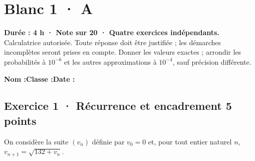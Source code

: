 \fi

\ifmxteacher

\mxnewpage{}\label{sujet:5-3}

\section*{Blanc 1 · A}


\textbf{Durée : 4 h · Note sur 20 · Quatre exercices indépendants.}\\Calculatrice autorisée. Toute réponse doit être justifiée ; les démarches incomplètes seront prises en compte. Donner les valeurs exactes ; arrondir les probabilités à $10^{-6}$ et les autres approximations à $10^{-4}$, sauf précision différente.

\smallskip\textbf{Nom :}\enspace\dotfill\quad\textbf{Classe :}\enspace\dotfill\quad\textbf{Date :}\enspace\dotfill

\subsection*{Exercice 1 · Récurrence et encadrement \hfill 5 points}On considère la suite $(v_n)$ définie par $v_0=0$ et, pour tout entier naturel $n$, $v_{n+1}=\sqrt{132+v_n}$.

